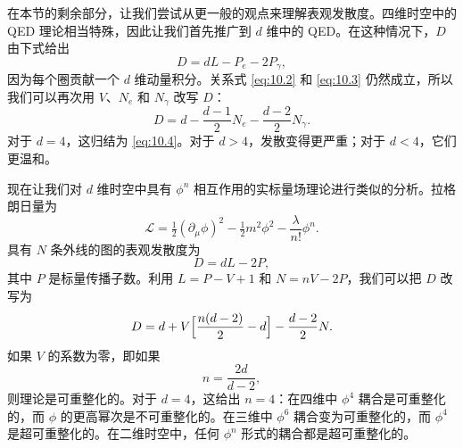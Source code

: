 在本节的剩余部分，让我们尝试从更一般的观点来理解表观发散度。四维时空中的 QED 理论相当特殊，因此让我们首先推广到 $d$ 维中的 QED。在这种情况下，$D$ 由下式给出
\begin{equation}
  D = dL - P_e - 2P_\gamma ,
  \label{eq:10.10}
\end{equation}
因为每个圈贡献一个 $d$ 维动量积分。关系式 \eqref{eq:10.2} 和 \eqref{eq:10.3} 仍然成立，所以我们可以再次用 $V$、$N_e$ 和 $N_\gamma$ 改写 $D$：
\begin{equation}
  D = d - \frac{d-1}{2}N_e - \frac{d-2}{2}N_\gamma .
\end{equation}
对于 $d = 4$，这归结为 \eqref{eq:10.4}。对于 $d > 4$，发散变得更严重；对于 $d < 4$，它们更温和。

现在让我们对 $d$ 维时空中具有 $\phi^n$ 相互作用的实标量场理论进行类似的分析。拉格朗日量为
\begin{equation}
  \mathcal{L} = \tfrac{1}{2}(\partial_\mu\phi)^2 - \tfrac{1}{2}m^2\phi^2
    - \frac{\lambda}{n!}\phi^n .
  \label{eq:10.12}
\end{equation}
具有 $N$ 条外线的图的表观发散度为
\begin{equation}
  D = dL - 2P ,
  \label{eq:10.13}
\end{equation}
其中 $P$ 是标量传播子数。利用 $L = P - V + 1$ 和 $N = nV - 2P$，我们可以把 $D$ 改写为
\begin{equation}
  D = d + V\Bigl[ \frac{n(d-2)}{2} - d \Bigr] - \frac{d-2}{2}N .
  \label{eq:10.13b}
\end{equation}
如果 $V$ 的系数为零，即如果
\begin{equation}
  n = \frac{2d}{d-2} ,
\end{equation}
则理论是可重整化的。对于 $d = 4$，这给出 $n = 4$：在四维中 $\phi^4$ 耦合是可重整化的，而 $\phi$ 的更高幂次是不可重整化的。在三维中 $\phi^6$ 耦合变为可重整化的，而 $\phi^4$ 是超可重整化的。在二维时空中，任何 $\phi^n$ 形式的耦合都是超可重整化的。


